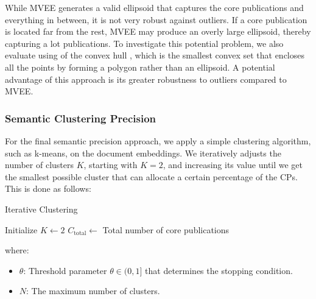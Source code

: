 While MVEE generates a valid ellipsoid that captures the core publications and everything in between, it is not very robust against outliers. If a core publication is located far from the rest, MVEE may produce an overly large ellipsoid, thereby capturing a lot publications. To investigate this potential problem, we also evaluate using of the convex hull \autocite{Kirkpatrick1986}, which is the smallest convex set that encloses all the points by forming a polygon rather than an ellipsoid. A potential advantage of this approach is its greater robustness to outliers compared to MVEE.

\subsubsection{Semantic Clustering Precision}

For the final semantic precision approach, we apply a simple clustering algorithm, such as k-means, on the document embeddings. We iteratively adjusts the number of clusters $K$, starting with $K=2$, and increasing its value until we get the smallest possible cluster that can allocate a certain percentage of the CPs. This is done as follows:

\begin{algorithm}
	\caption{Iterative Clustering}
	Initialize $K \gets 2$ \;
	$C_{\text{total}} \gets$ Total number of core publications\;
	
	\label{algo:sp-clustering}
\end{algorithm}

\noindent where:
\begin{itemize}
	\item \( \theta \): Threshold parameter $\theta \in (0, 1]$ that determines the stopping condition.
	\item $N$: The maximum number of clusters.
\end{itemize}

